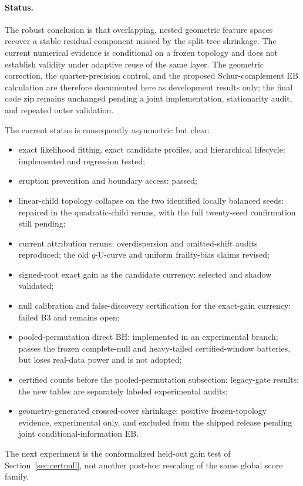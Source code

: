 \documentclass[11pt]{article}
\begin{document}
\paragraph{Status.}
The robust conclusion is that overlapping, nested geometric feature spaces recover a stable residual
component missed by the split-tree shrinkage. The current numerical evidence is conditional on a
frozen topology and does not establish validity under adaptive reuse of the same layer. The geometric
correction, the quarter-precision control, and the proposed Schur-complement EB calculation are
therefore documented here as development results only; the final code zip remains unchanged pending
a joint implementation, stationarity audit, and repeated outer validation.

The current status is consequently asymmetric but clear:
\begin{itemize}[leftmargin=2em,itemsep=1pt]
\item exact likelihood fitting, exact candidate profiles, and hierarchical lifecycle: implemented and
regression tested;
\item eruption prevention and boundary access: passed;
\item linear-child topology collapse on the two identified locally balanced seeds: repaired in the
quadratic-child reruns, with the full twenty-seed confirmation still pending;
\item current attribution reruns: overdispersion and omitted-shift audits reproduced; the old
$q$-U-curve and uniform frailty-bias claims revised;
\item signed-root exact gain as the candidate currency: selected and shadow validated;
\item null calibration and false-discovery certification for the exact-gain currency: failed B3 and remains open;
\item pooled-permutation direct BH: implemented in an experimental branch; passes the frozen complete-null and heavy-tailed certified-window batteries, but loses real-data power and is not adopted;
\item certified counts before the pooled-permutation subsection: legacy-gate results; the new tables are separately labeled experimental audits;
\item geometry-generated crossed-cover shrinkage: positive frozen-topology evidence, experimental
only, and excluded from the shipped release pending joint conditional-information EB.
\end{itemize}
The next experiment is the conformalized held-out gain test of
Section~\ref{sec:certnull}, not another post-hoc rescaling of the same global score family.
\end{document}
